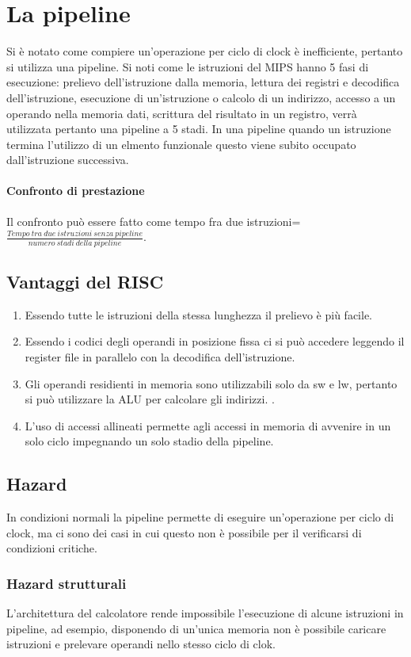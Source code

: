 \chapter{La pipeline}
Si \`e notato come compiere un'operazione per ciclo di clock \`e inefficiente, pertanto si utilizza una pipeline. Si noti come le istruzioni del MIPS hanno 5 fasi 
di esecuzione: prelievo dell'istruzione dalla memoria, lettura dei registri e decodifica dell'istruzione, esecuzione di un'istruzione o calcolo di un indirizzo, accesso
a un operando nella memoria dati, scrittura del risultato in un registro, verr\`a utilizzata pertanto una pipeline a 5 stadi. In una pipeline quando un istruzione termina
l'utilizzo di un elmento funzionale questo viene subito occupato dall'istruzione successiva. 
\subsubsection{Confronto di prestazione}
Il confronto pu\`o essere fatto come tempo fra due istruzioni=$\frac{Tempo\ tra\ due\ istruzioni\ senza\ pipeline}{numero\ stadi\ della\ pipeline}$.
\section{Vantaggi del RISC}
\begin{enumerate}
\item Essendo tutte le istruzioni della stessa lunghezza il prelievo \`e pi\`u facile.
\item Essendo i codici degli operandi in posizione fissa ci si pu\`o accedere leggendo il register file in parallelo con la decodifica dell'istruzione.
\item Gli operandi residienti in memoria sono utilizzabili solo da sw e lw, pertanto si pu\`o utilizzare la ALU per calcolare gli indirizzi. .
\item L'uso di accessi allineati permette agli accessi in memoria di avvenire in un solo ciclo impegnando un solo stadio della pipeline. 
\end{enumerate}
\section{Hazard}
In condizioni normali la pipeline permette di eseguire un'operazione per ciclo di clock, ma ci sono dei casi in cui questo non \`e possibile per il verificarsi di 
condizioni critiche.
\subsection{Hazard strutturali}
L'architettura del calcolatore rende impossibile l'esecuzione di alcune istruzioni in pipeline, ad esempio, disponendo di un'unica memoria non \`e possibile caricare 
istruzioni e prelevare operandi nello stesso ciclo di clok.

